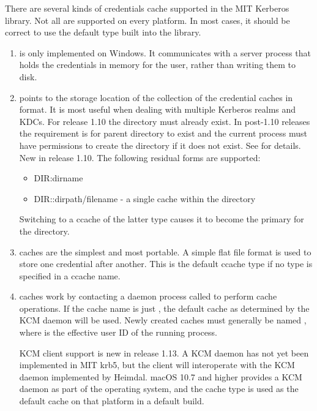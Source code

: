 \documentclass[letterpaper,10pt,english]{sphinxmanual}
\begin{document}
There are several kinds of credentials cache supported in the MIT
Kerberos library.  Not all are supported on every platform.  In most
cases, it should be correct to use the default type built into the
library.
\begin{enumerate}
\item {} 
 is only implemented on Windows.  It communicates with a
server process that holds the credentials in memory for the user,
rather than writing them to disk.

\item {} 
 points to the storage location of the collection of the
credential caches in  format. It is most useful when dealing
with multiple Kerberos realms and KDCs.  For release 1.10 the
directory must already exist.  In post-1.10 releases the
requirement is for parent directory to exist and the current
process must have permissions to create the directory if it does
not exist. See {\hyperref[\detokenize{basic/ccache_def:col-ccache}]{}} for details.  New in release 1.10.
The following residual forms are supported:
\begin{itemize}
\item {} 
DIR:dirname

\item {} 
DIR::dirpath/filename - a single cache within the directory

\end{itemize}

Switching to a ccache of the latter type causes it to become the
primary for the directory.

\item {} 
 caches are the simplest and most portable. A simple flat
file format is used to store one credential after another.  This is
the default ccache type if no type is specified in a ccache name.

\item {} 
 caches work by contacting a daemon process called 
to perform cache operations.  If the cache name is just ,
the default cache as determined by the KCM daemon will be used.
Newly created caches must generally be named ,
where  is the effective user ID of the running process.

KCM client support is new in release 1.13.  A KCM daemon has not
yet been implemented in MIT krb5, but the client will interoperate
with the KCM daemon implemented by Heimdal.  macOS 10.7 and higher
provides a KCM daemon as part of the operating system, and the
 cache type is used as the default cache on that platform in
a default build.


\end{enumerate}
\end{document}
